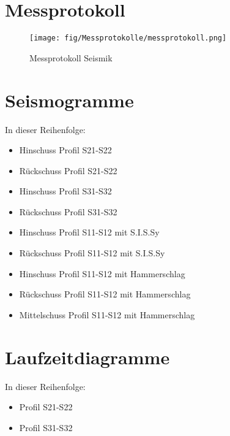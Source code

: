 \section{Messprotokoll}

\begin{figure}[h!]
 \centering
 \texttt{[image: fig/Messprotokolle/messprotokoll.png]}
 \caption{Messprotokoll Seismik}
 \label{fig:messprotokoll}
\end{figure}

\section{Seismogramme}

In dieser Reihenfolge:
\begin{itemize}
 \item Hinschuss Profil S21-S22
 \item Rückschuss Profil S21-S22
 \item Hinschuss Profil S31-S32
 \item Rückschuss Profil S31-S32
 \item Hinschuss Profil S11-S12 mit S.I.S.Sy
 \item Rückschuss Profil S11-S12 mit S.I.S.Sy
 \item Hinschuss Profil S11-S12 mit Hammerschlag
 \item Rückschuss Profil S11-S12 mit Hammerschlag
 \item Mittelschuss Profil S11-S12 mit Hammerschlag
\end{itemize}


\section{Laufzeitdiagramme}

In dieser Reihenfolge:
\begin{itemize}
 \item Profil S21-S22
 \item Profil S31-S32
\end{itemize}


